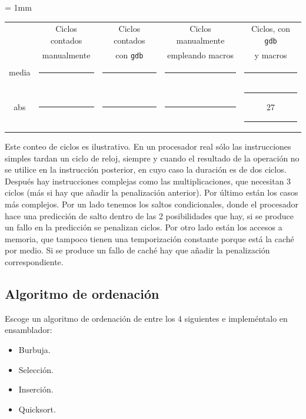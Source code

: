 \begin{center}
\small
\colorbox[gray]{0.9}{
\tabcolsep = 1mm
\begin{tabular}{ccccc}
&Ciclos contados & Ciclos contados & Ciclos manualmente & Ciclos, con {\tt gdb} \\
&manualmente & con {\tt gdb}       & empleando macros & y macros \\
media &
\colorbox[gray]{1}{\rule{0cm}{0.46cm}\rule{2.6cm}{0cm}} &
\colorbox[gray]{1}{\rule{0cm}{0.46cm}\rule{2.6cm}{0cm}} &
\colorbox[gray]{1}{\rule{0cm}{0.46cm}\rule{2.6cm}{0cm}} &
\colorbox[gray]{1}{\rule{0cm}{0.46cm}\rule{2.6cm}{0cm}} \\[1mm]
abs &
\colorbox[gray]{1}{\rule{0cm}{0.46cm}\rule{2.6cm}{0cm}} &
\colorbox[gray]{1}{\rule{0cm}{0.46cm}\rule{2.6cm}{0cm}} &
\colorbox[gray]{1}{\rule{0cm}{0.46cm}\rule{2.6cm}{0cm}} &
\colorbox[gray]{1}{\rule{0cm}{0.46cm}\rule{1.1cm}{0cm}27\rule{1.1cm}{0cm}} \\
\end{tabular}
\vspace{0.5ex}
}
\end{center}

Este conteo de ciclos es ilustrativo. En un procesador real sólo
las instrucciones simples tardan un ciclo de reloj, siempre y cuando
el resultado de la operación no se utilice en la instrucción posterior,
en cuyo caso la duración es de dos ciclos. Después hay instrucciones
complejas como las multiplicaciones, que necesitan 3 ciclos (más si hay
que añadir la penalización anterior). Por último están los casos 
más complejos. Por un lado tenemos los saltos condicionales, donde el
procesador hace una predicción de salto dentro de las 2 posibilidades
que hay, si se produce un fallo en la predicción se penalizan ciclos.
Por otro lado están los accesos a memoria, que tampoco tienen una
temporización constante porque está la caché por medio. Si se produce
un fallo de caché hay que añadir la penalización correspondiente.

\subsection{Algoritmo de ordenación}

Escoge un algoritmo de ordenación de entre los 4 siguientes e
impleméntalo en ensamblador:

\begin{itemize}
  \item Burbuja.
  \item Selección.
  \item Inserción.
  \item Quicksort.
\end{itemize}

